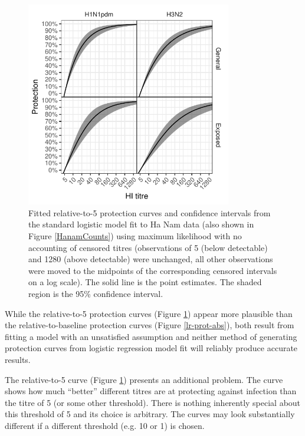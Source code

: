 \documentclass[12pt]{article}
\begin{document}
\pagebreak

\begin{figure}[htp]
	\centering
	\includegraphics[width=0.8\textwidth]{../fit-logistic-boot-plot/hanam-hi-prot-rel.pdf}
	\caption{
	Fitted relative-to-5 protection curves and confidence intervals from the standard logistic model fit to Ha Nam data (also shown in Figure \ref{HanamCounts}) using maximum likelihood with no accounting of censored titres (observations of 5 (below detectable) and 1280 (above detectable) were unchanged, all other observations were moved to the midpoints of the corresponding censored intervals on a log scale). The solid line is the point estimates. The shaded region is the 95\% confidence interval.
	}
	\label{lr-prot-rel}
\end{figure}

While the relative-to-5 protection curves (Figure \ref{lr-prot-rel}) appear more plausible than the relative-to-baseline protection curves (Figure \ref{lr-prot-abs}), both result from fitting a model with an unsatisfied assumption and neither method of generating protection curves from logistic regression model fit will reliably produce accurate results.

The relative-to-5 curve (Figure \ref{lr-prot-rel}) presents an additional problem. The curve shows how much ``better'' different titres are at protecting against infection than the titre of 5 (or some other threshold). There is nothing inherently special about this threshold of 5 and its choice is arbitrary. The curves may look substantially different if a different threshold (e.g. 10 or 1) is chosen.
\end{document}

